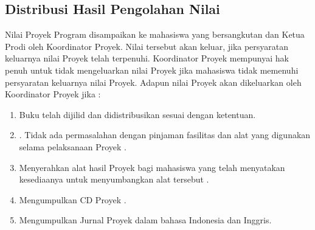 \subsection{Distribusi	Hasil	Pengolahan	Nilai}
Nilai	 Proyek	 Program	 disampaikan	 ke	 mahasiswa	 yang	 bersangkutan	 dan	 Ketua	 Prodi oleh	 Koordinator	 Proyek.	 Nilai	 tersebut	 akan	 keluar,	 jika	 persyaratan	 keluarnya	 nilai	Proyek	 telah	 terpenuhi.	 Koordinator	 Proyek	 mempunyai	 hak	 penuh	 untuk	 tidak	mengeluarkan	nilai	Proyek	jika	mahasiswa	 tidak	memenuhi	persyaratan	keluarnya	nilai	Proyek.	Adapun	nilai	Proyek	akan	dikeluarkan	oleh	Koordinator	Proyek	jika	:
\begin{enumerate}
	\item Buku	telah	dijilid	dan	didistribusikan	sesuai	dengan	ketentuan.
	\item . Tidak		ada			permasalahan		dengan		pinjaman		fasilitas	dan	alat	yang	digunakan	selama	
pelaksanaan	Proyek .
	\item Menyerahkan	 alat	 hasil	 Proyek	 bagi	 mahasiswa	 yang	 telah	 menyatakan	 kesediaanya	untuk	menyumbangkan	alat	tersebut .
	\item Mengumpulkan	CD	Proyek .
	\item Mengumpulkan	Jurnal Proyek	dalam	bahasa	Indonesia	dan	Inggris.	
\end{enumerate}